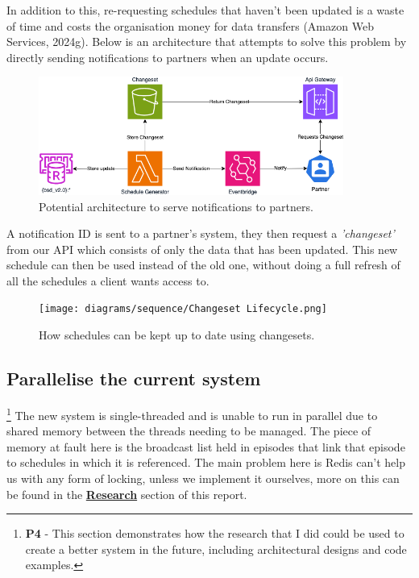 In addition to this, re-requesting schedules that haven't been updated is a waste of time and costs the organisation money for data 
transfers (Amazon Web Services, 2024g). Below is an architecture that attempts to solve this problem by directly sending notifications to 
partners when an update occurs.

\begin{figure}[H]
  \centering
  \includegraphics[width=10cm]{assets/architectures/changesets.drawio.png}
  \caption{Potential architecture to serve notifications to partners.}
  \label{fig:changsetArchitecture}
\end{figure}

A notification ID is sent to a partner's system, they then request a \textit{'changeset'} from our API which consists of only the data that has been updated.
This new schedule can then be used instead of the old one, without doing a full refresh of all the schedules a client wants access to.

\begin{figure}[H]
  \centering
  \texttt{[image: diagrams/sequence/Changeset Lifecycle.png]}
  \caption{How schedules can be kept up to date using changesets.}
  \label{fig:changsetLifecycle}
\end{figure}

\newpage
\subsection{Parallelise the current system}
\label{sec:dynamo}
\footnote{\textbf{P4} - This section demonstrates how the research that I did could be used to create a better system in the future, including architectural designs 
and code examples.}
The new system is single-threaded and is unable to run in parallel due to shared memory between the threads needing to be managed. The piece of memory
at fault here is the broadcast list held in episodes that link that episode to schedules in which it is referenced. The main problem here is Redis 
can't help us with any form of locking, unless we implement it ourselves, more on this can be found in the \hyperref[sec:storageSolutions]{\textbf{Research}}
section of this report.

